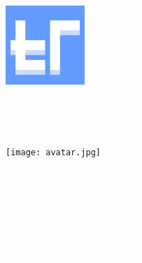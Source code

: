 \documentclass[12pt]{article}
\begin{document}
\pagecolor{lb}

\begin{titlepage}

    \noindent\begin{minipage}{0.3\textwidth}%
        \includegraphics[width=3cm, height=3cm]{logo 512.png}
    \end{minipage}%
    \hfill%
    \begin{minipage}{0.6\textwidth}\raggedleft
        \fontsize{40}{40}\selectfont\textcolor{white}{
            \begin{flushleft}
                TwittReport
            \end{flushleft}
        }
    \end{minipage}
    \vspace{0.8cm}


    \begin{minipage}{0.75\linewidth}
        \fontsize{20}{20}\selectfont\textcolor{white}{
            \begin{flushleft}
                \textbf{Username: @USERNAME}
            \end{flushleft}
        }
    \end{minipage}
    \hfil
    \begin{minipage}{0.2\linewidth}
        \texttt{[image: avatar.jpg]}
    \end{minipage}%


    \vspace{0.8cm}
    \noindent
    \LARGE
    \fontsize{20}{20}\selectfont\textcolor{white}{\textbf{
            Top 5 Mentions:\\\\
        }}
    \LARGE
    \fontsize{15}{15}\selectfont\textcolor{white}{\textbf{
            @MENTIONS
        }}

    \vspace{0.5cm}
    \noindent
    \LARGE
    \fontsize{20}{20}\selectfont\textcolor{white}{\textbf{
            Top 5 Hashtags:\\\\
        }}
    \LARGE
    \fontsize{15}{15}\selectfont\textcolor{white}{\textbf{
            @HASHTAGS
        }}
    \vspace{0.5cm}


\end{titlepage}
\end{document}
